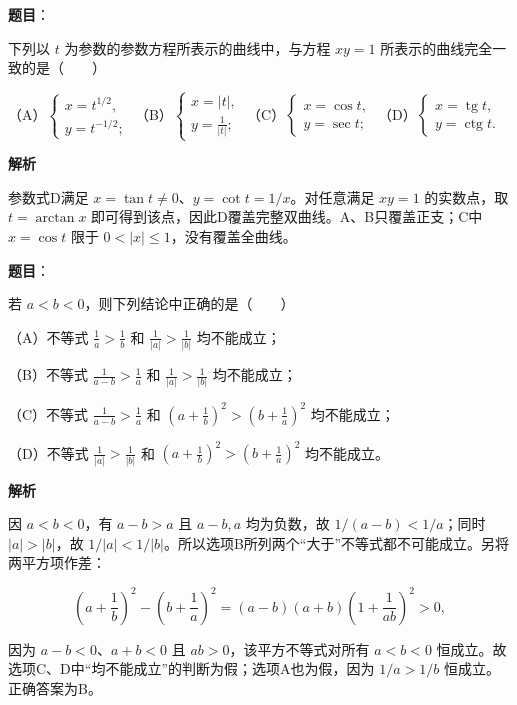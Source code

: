 \begin{answer}

\textbf{题目}：

下列以 $t$ 为参数的参数方程所表示的曲线中，与方程 $xy=1$ 所表示的曲线完全一致的是\mbox{（　　）}

（A）$\begin{cases}x=t^{1/2},\\ y=t^{-1/2};\end{cases}$
（B）$\begin{cases}x=|t|,\\ y=\frac1{|t|};\end{cases}$
（C）$\begin{cases}x=\cos t,\\ y=\sec t;\end{cases}$
（D）$\begin{cases}x=\operatorname{tg}t,\\ y=\operatorname{ctg}t.\end{cases}$

\textbf{解析}

参数式D满足 $x=\tan t\ne0$、$y=\cot t=1/x$。对任意满足 $xy=1$ 的实数点，取 $t=\arctan x$ 即可得到该点，因此D覆盖完整双曲线。A、B只覆盖正支；C中 $x=\cos t$ 限于 $0<|x|\le1$，没有覆盖全曲线。


\end{answer}
\begin{answer}

\textbf{题目}：

若 $a<b<0$，则下列结论中正确的是\mbox{（　　）}

（A）不等式 $\frac1a>\frac1b$ 和 $\frac1{|a|}>\frac1{|b|}$ 均不能成立；

（B）不等式 $\frac1{a-b}>\frac1a$ 和 $\frac1{|a|}>\frac1{|b|}$ 均不能成立；

（C）不等式 $\frac1{a-b}>\frac1a$ 和 $\left(a+\frac1b\right)^2>\left(b+\frac1a\right)^2$ 均不能成立；

（D）不等式 $\frac1{|a|}>\frac1{|b|}$ 和 $\left(a+\frac1b\right)^2>\left(b+\frac1a\right)^2$ 均不能成立。

\textbf{解析}

因 $a<b<0$，有 $a-b>a$ 且 $a-b,a$ 均为负数，故 $1/(a-b)<1/a$；同时 $|a|>|b|$，故 $1/|a|<1/|b|$。所以选项B所列两个“大于”不等式都不可能成立。另将两平方项作差：

\nopagebreak[4]
\[
\left(a+\frac1b\right)^2-\left(b+\frac1a\right)^2
=(a-b)(a+b)\left(1+\frac1{ab}\right)^2>0,
\]

因为 $a-b<0$、$a+b<0$ 且 $ab>0$，该平方不等式对所有 $a<b<0$ 恒成立。故选项C、D中“均不能成立”的判断为假；选项A也为假，因为 $1/a>1/b$ 恒成立。正确答案为B。


\end{answer}
